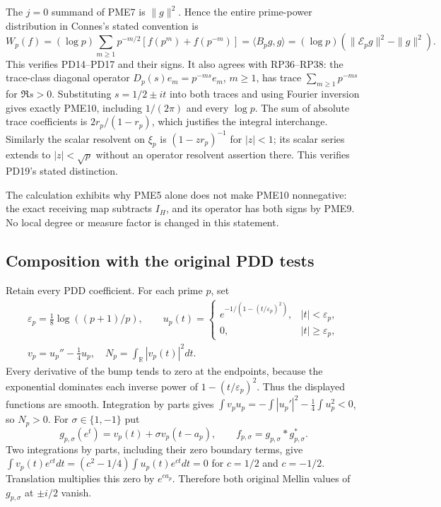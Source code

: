 \documentclass[11pt]{article}
\begin{document}
The $j=0$ summand of PME7 is $\|g\|^2$. Hence the entire
prime-power distribution in Connes's stated convention is
\[
 W_p(f)=(\log p)\sum_{m\ge1}p^{-m/2}
                  [f(p^m)+f(p^{-m})]
       =\langle B_pg,g\rangle
       =(\log p)(\|\mathcal E_pg\|^2-\|g\|^2).
 \tag{PME10}
\]
This verifies PD14--PD17 and their signs. It also agrees with
RP36--RP38: the trace-class diagonal operator
$D_p(s)e_m=p^{-ms}e_m$, $m\ge1$, has trace
$\sum_{m\ge1}p^{-ms}$ for $\Re s>0$. Substituting
$s=1/2\pm it$ into both traces and using Fourier inversion gives
exactly PME10, including $1/(2\pi)$ and every $\log p$.
The sum of absolute trace coefficients is $2r_p/(1-r_p)$,
which justifies the integral interchange. Similarly the scalar
resolvent on $\xi_p$ is $(1-zr_p)^{-1}$ for $|z|<1$;
its scalar series extends to $|z|<\sqrt p$ without an operator
resolvent assertion there. This verifies PD19's stated distinction.

The calculation exhibits why PME5 alone does not make PME10
nonnegative: the exact receiving map subtracts $I_H$, and its
operator has both signs by PME9. No local degree or measure factor
is changed in this statement.

\subsection{Composition with the original PDD tests}

Retain every PDD coefficient. For each prime $p$, set
\[
 \begin{gathered}
 \varepsilon_p=\tfrac18\log((p+1)/p),\qquad
 u_p(t)=
 \begin{cases}e^{-1/(1-(t/\varepsilon_p)^2)},&|t|<\varepsilon_p,\\
 0,&|t|\ge\varepsilon_p,
 \end{cases}\\
 v_p=u_p''-\tfrac14u_p,\quad
 N_p=\int_{\mathbb R}|v_p(t)|^2dt.
 \end{gathered}
 \tag{PME11}
\]
Every derivative of the bump tends to zero at the endpoints,
because the exponential dominates each inverse power of
$1-(t/\varepsilon_p)^2$. Thus the displayed functions are smooth.
Integration by parts gives
$\int v_pu_p=-\int|u_p'|^2-\tfrac14\int u_p^2<0$, so $N_p>0$.
For $\sigma\in\{1,-1\}$ put
\[
 g_{p,\sigma}(e^t)=v_p(t)+\sigma v_p(t-a_p),\qquad
 f_{p,\sigma}=g_{p,\sigma}*g_{p,\sigma}^*.
 \tag{PME12}
\]
Two integrations by parts, including their zero boundary terms, give
$\int v_p(t)e^{ct}dt=(c^2-1/4)\int u_p(t)e^{ct}dt=0$
for $c=1/2$ and $c=-1/2$. Translation multiplies this zero by
$e^{ca_p}$. Therefore both original Mellin values of $g_{p,\sigma}$
at $\pm i/2$ vanish.
\end{document}
